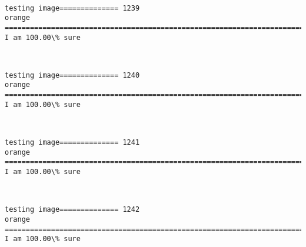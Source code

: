 \documentclass[11pt]{article}
\begin{document}
    \begin{center}
    \end{center}
    { \hspace*{\fill} \\}
    
    \begin{Verbatim}[commandchars=\\\{\}]
testing image============== 1239
orange
============================================================================
I am 100.00\% sure

    \end{Verbatim}

    \begin{center}
    \end{center}
    { \hspace*{\fill} \\}
    
    \begin{Verbatim}[commandchars=\\\{\}]
testing image============== 1240
orange
============================================================================
I am 100.00\% sure

    \end{Verbatim}

    \begin{center}
    \end{center}
    { \hspace*{\fill} \\}
    
    \begin{Verbatim}[commandchars=\\\{\}]
testing image============== 1241
orange
============================================================================
I am 100.00\% sure

    \end{Verbatim}

    \begin{center}
    \end{center}
    { \hspace*{\fill} \\}
    
    \begin{Verbatim}[commandchars=\\\{\}]
testing image============== 1242
orange
============================================================================
I am 100.00\% sure

    \end{Verbatim}
\end{document}

